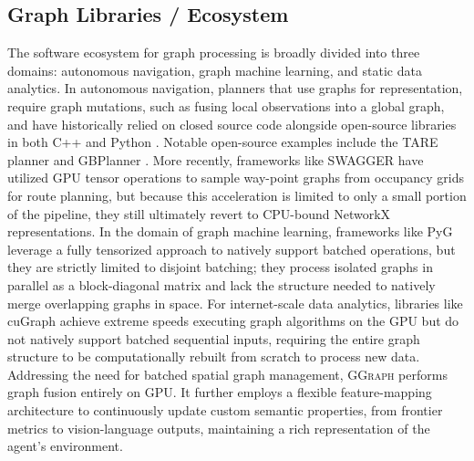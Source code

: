 \documentclass{article}
\newcommand{\sysname}{\textcolor{ggcolor}{\textsc{GGraph}}\xspace}
\begin{document}
\subsection{Graph Libraries / Ecosystem}
The software ecosystem for graph processing is broadly divided into three domains: autonomous navigation, graph machine learning, and static data analytics. In autonomous navigation, planners that use graphs for representation, require graph mutations, such as fusing local observations into a global graph, and have historically relied on closed source code alongside open-source libraries in both C++ and Python \cite{SciPyProceedings_11}. Notable open-source examples include the TARE planner \cite{tare} and GBPlanner \cite{gb_planner}. More recently, frameworks like SWAGGER \cite{swagger} have utilized GPU tensor operations to sample way-point graphs from occupancy grids for route planning, but because this acceleration is limited to only a small portion of the pipeline, they still ultimately revert to CPU-bound NetworkX representations.
In the domain of graph machine learning, frameworks like PyG\cite{fey2019pyg} leverage a fully tensorized approach to natively support batched operations, but they are strictly limited to disjoint batching; they process isolated graphs in parallel as a block-diagonal matrix and lack the structure needed to natively merge overlapping graphs in space. For internet-scale data analytics, libraries like cuGraph achieve extreme speeds executing graph algorithms on the GPU but do not natively support batched sequential inputs, requiring the entire graph structure to be computationally rebuilt from scratch to process new data. \\
Addressing the need for batched spatial graph management, \sysname performs graph fusion entirely on GPU. It further employs a flexible feature-mapping architecture to continuously update custom semantic properties, from frontier metrics to vision-language outputs, maintaining a rich representation of the agent's environment.
\newcommand{\cmark}{\textcolor{green!70!black}{\ding{51}}} %
\newcommand{\xmark}{\textcolor{red}{\ding{55}}}            %
\newcommand{\otick}{\textcolor{orange}{\ding{51}}}         %
\end{document}

